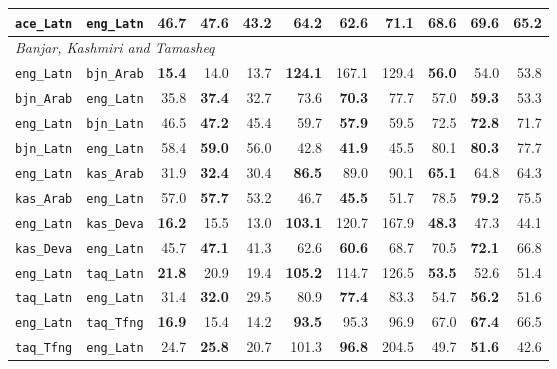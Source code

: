 \begin{longtable}{@{}ll rrr rrr rrr@{}}
\texttt{ace\_Latn} & \texttt{eng\_Latn} & 46.7 & \textbf{47.6} & 43.2 & 64.2 & \textbf{62.6} & 71.1 & 68.6 & \textbf{69.6} & 65.2 \\
\midrule
\multicolumn{11}{l}{\textit{Banjar, Kashmiri and Tamasheq}} \\
\texttt{eng\_Latn} & \texttt{bjn\_Arab} & \textbf{15.4} & 14.0 & 13.7 & \textbf{124.1} & 167.1 & 129.4 & \textbf{56.0} & 54.0 & 53.8 \\
\texttt{bjn\_Arab} & \texttt{eng\_Latn} & 35.8 & \textbf{37.4} & 32.7 & 73.6 & \textbf{70.3} & 77.7 & 57.0 & \textbf{59.3} & 53.3 \\
\texttt{eng\_Latn} & \texttt{bjn\_Latn} & 46.5 & \textbf{47.2} & 45.4 & 59.7 & \textbf{57.9} & 59.5 & 72.5 & \textbf{72.8} & 71.7 \\
\texttt{bjn\_Latn} & \texttt{eng\_Latn} & 58.4 & \textbf{59.0} & 56.0 & 42.8 & \textbf{41.9} & 45.5 & 80.1 & \textbf{80.3} & 77.7 \\
\texttt{eng\_Latn} & \texttt{kas\_Arab} & 31.9 & \textbf{32.4} & 30.4 & \textbf{86.5} & 89.0 & 90.1 & \textbf{65.1} & 64.8 & 64.3 \\
\texttt{kas\_Arab} & \texttt{eng\_Latn} & 57.0 & \textbf{57.7} & 53.2 & 46.7 & \textbf{45.5} & 51.7 & 78.5 & \textbf{79.2} & 75.5 \\
\texttt{eng\_Latn} & \texttt{kas\_Deva} & \textbf{16.2} & 15.5 & 13.0 & \textbf{103.1} & 120.7 & 167.9 & \textbf{48.3} & 47.3 & 44.1 \\
\texttt{kas\_Deva} & \texttt{eng\_Latn} & 45.7 & \textbf{47.1} & 41.3 & 62.6 & \textbf{60.6} & 68.7 & 70.5 & \textbf{72.1} & 66.8 \\
\texttt{eng\_Latn} & \texttt{taq\_Latn} & \textbf{21.8} & 20.9 & 19.4 & \textbf{105.2} & 114.7 & 126.5 & \textbf{53.5} & 52.6 & 51.4 \\
\texttt{taq\_Latn} & \texttt{eng\_Latn} & 31.4 & \textbf{32.0} & 29.5 & 80.9 & \textbf{77.4} & 83.3 & 54.7 & \textbf{56.2} & 51.6 \\
\texttt{eng\_Latn} & \texttt{taq\_Tfng} & \textbf{16.9} & 15.4 & 14.2 & \textbf{93.5} & 95.3 & 96.9 & 67.0 & \textbf{67.4} & 66.5 \\
\texttt{taq\_Tfng} & \texttt{eng\_Latn} & 24.7 & \textbf{25.8} & 20.7 & 101.3 & \textbf{96.8} & 204.5 & 49.7 & \textbf{51.6} & 42.6 \\
\end{longtable}
\endgroup
